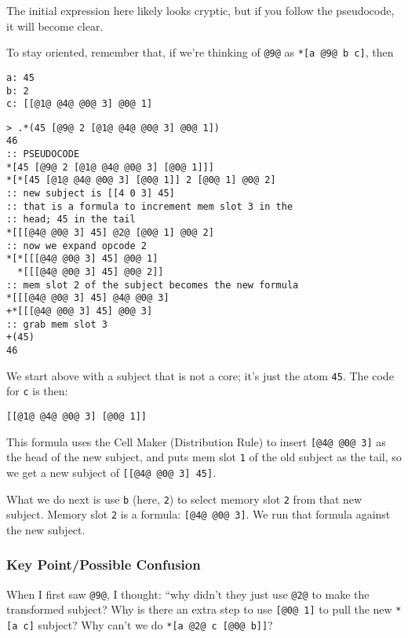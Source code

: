 \documentclass[twoside]{article}
\begin{document}
The initial expression here likely looks cryptic, but if you follow the pseudocode, it will become clear.

To stay oriented, remember that, if we're thinking of \lstinline[style=inlinecode]{@9@} as \lstinline[style=inlinecode]{*[a @9@ b c]}, then

\begin{lstlisting}[style=listingblock]
a: 45
b: 2
c: [[@1@ @4@ @0@ 3] @0@ 1]
\end{lstlisting}

\begin{lstlisting}[style=listingcode]
> .*(45 [@9@ 2 [@1@ @4@ @0@ 3] @0@ 1])
46
:: PSEUDOCODE
*[45 [@9@ 2 [@1@ @4@ @0@ 3] [@0@ 1]]]
*[*[45 [@1@ @4@ @0@ 3] [@0@ 1]] 2 [@0@ 1] @0@ 2]
:: new subject is [[4 0 3] 45]
:: that is a formula to increment mem slot 3 in the
:: head; 45 in the tail
*[[[@4@ @0@ 3] 45] @2@ [@0@ 1] @0@ 2]
:: now we expand opcode 2
*[*[[[@4@ @0@ 3] 45] @0@ 1]
  *[[[@4@ @0@ 3] 45] @0@ 2]]
:: mem slot 2 of the subject becomes the new formula
*[[[@4@ @0@ 3] 45] @4@ @0@ 3]
+*[[[@4@ @0@ 3] 45] @0@ 3]
:: grab mem slot 3
+(45)
46
\end{lstlisting}

We start above with a subject that is not a core; it's just the atom \lstinline[style=inlinecode]{45}. The code for \lstinline[style=inlinecode]{c} is then:

\begin{lstlisting}[style=listingblock]
[[@1@ @4@ @0@ 3] [@0@ 1]]
\end{lstlisting}

This formula uses the Cell Maker (Distribution Rule) to insert \lstinline[style=inlinecode]{[@4@ @0@ 3]} as the head of the new subject, and puts mem slot \lstinline[style=inlinecode]{1} of the old subject as the tail, so we get a new subject of \lstinline[style=inlinecode]{[[@4@ @0@ 3] 45]}.

What we do next is use \lstinline[style=inlinecode]{b} (here, \lstinline[style=inlinecode]{2}) to select memory slot \lstinline[style=inlinecode]{2} from that new subject. Memory slot \lstinline[style=inlinecode]{2} is a formula: \lstinline[style=inlinecode]{[@4@ @0@ 3]}. We run that formula against the new subject.

\subsubsection{Key Point/Possible Confusion}

When I first saw \lstinline[style=inlinecode]{@9@}, I thought: ``why didn't they just use \lstinline[style=inlinecode]{@2@} to make the transformed subject? Why is there an extra step to use \lstinline[style=inlinecode]{[@0@ 1]} to pull the new \lstinline[style=inlinecode]{*[a c]} subject? Why can't we do \lstinline[style=inlinecode]{*[a @2@ c [@0@ b]]}?
\end{document}
